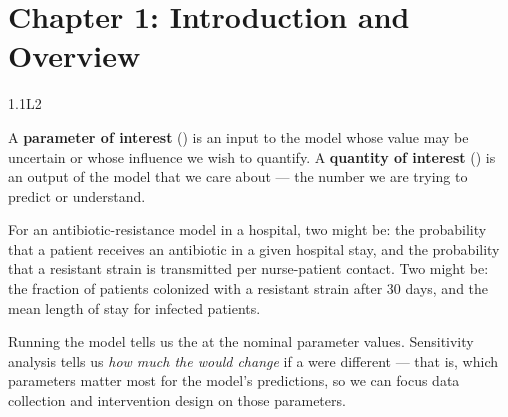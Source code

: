 
\section{Chapter 1: Introduction and Overview}

\begin{solution}{1.1}{L2}

\solanswer

A \textbf{parameter of interest} (\POI) is an input to the model
whose value may be uncertain or whose influence we wish to quantify.
A \textbf{quantity of interest} (\QOI) is an output of the model
that we care about --- the number we are trying to predict or understand.

\smallskip
For an antibiotic-resistance model in a hospital, two \POIs might be:
the probability that a patient receives an antibiotic in a given
hospital stay, and the probability that a resistant strain is
transmitted per nurse-patient contact. Two \QOIs might be:
the fraction of patients colonized with a resistant strain after
30 days, and the mean length of stay for infected patients.

\smallskip
Running the model tells us the \QOI at the nominal parameter values.
Sensitivity analysis tells us \emph{how much the \QOI would change}
if a \POI were different --- that is, which parameters matter most
for the model's predictions, so we can focus data collection and
intervention design on those parameters.


\end{solution}

